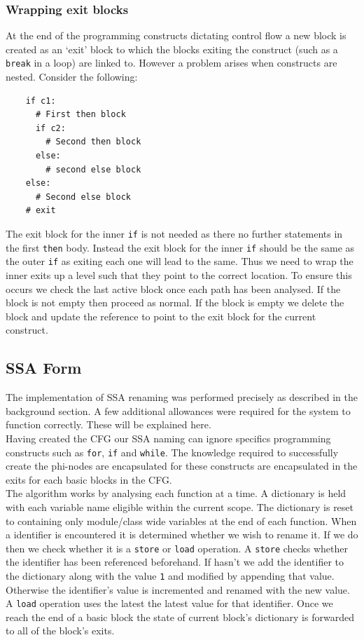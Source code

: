 \documentclass[12pt, titlepage]{article}
\begin{document}
\subsubsection{Wrapping exit blocks}
At the end of the programming constructs dictating control flow a new block is created as an `exit' block to which the blocks exiting the construct (such as a \texttt{break} in a loop) are linked to. However a problem arises when constructs are nested. Consider the following:
\begin{lstlisting}
    if c1:
      # First then block
      if c2:
        # Second then block
      else:
        # second else block
    else:
      # Second else block
    # exit
\end{lstlisting}
The exit block for the inner \texttt{if} is not needed as there no further statements in the first \texttt{then} body. Instead the exit block for the inner \texttt{if} should be the same as the outer \texttt{if} as exiting each one will lead to the same. Thus we need to wrap the inner exits up a level such that they point to the correct location. To ensure this occurs we check the last active block once each path has been analysed. If the block is not empty then proceed as normal. If the block is empty we delete the block and update the reference to point to the exit block for the current construct.

\subsection{SSA Form}
The implementation of SSA renaming was performed precisely as described in the background section. A few additional allowances were required for the system to function correctly. These will be explained here. \\
\indent Having created the CFG our SSA naming can ignore specifics programming constructs such as \texttt{for}, \texttt{if} and \texttt{while}. The knowledge required to successfully create the phi-nodes are encapsulated for these constructs are encapsulated in the exits for each basic blocks in the CFG. \\
\indent The algorithm works by analysing each function at a time. A dictionary is held with each variable name eligible within the current scope. The dictionary is reset to containing only module/class wide variables at the end of each function. When a identifier is encountered it is determined whether we wish to rename it. If we do then we check whether it is a \texttt{store} or \texttt{load} operation. A \texttt{store} checks whether the identifier has been referenced beforehand. If hasn't we add the identifier to the dictionary along with the value \texttt{1} and modified by appending that value. Otherwise the identifier's value is incremented and renamed with the new value. A \texttt{load} operation uses the latest the latest value for that identifier. Once we reach the end of a basic block the state of current block's dictionary is forwarded to all of the block's exits.
\end{document}
